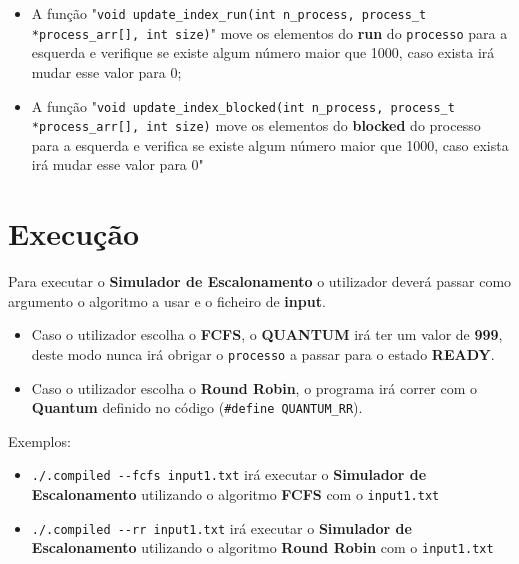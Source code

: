 \documentclass[11pt]{article}   %
\begin{document}
\begin{itemize}
\begin{itemize}
            \item A função "\verb|void update_index_run(int n_process, process_t *process_arr[], int size)|" \newline move os elementos do \textbf{run} do \verb|processo| para a esquerda e verifique se existe algum número maior que 1000, caso exista irá mudar esse valor para 0;
            \item A função "\verb|void update_index_blocked(int n_process, process_t *process_arr[], int size)| \newline move os elementos do \textbf{blocked} do processo para a esquerda e verifica se existe algum número maior que 1000, caso exista irá mudar esse valor para 0"
        \end{itemize}
\end{itemize}

\section{Execução}

\hspace{0,5cm}Para executar o \textbf{Simulador de Escalonamento} o utilizador deverá passar como argumento o algoritmo a usar e o ficheiro de \textbf{input}.
\begin{itemize}
    \item Caso o utilizador escolha o \textbf{FCFS}, o \textbf{QUANTUM} irá ter um valor de \textbf{999}, deste modo nunca irá obrigar o \verb|processo| a passar para o estado \textbf{READY}.
    \item Caso o utilizador escolha o \textbf{Round Robin}, o programa irá correr com o \textbf{Quantum} definido no código (\verb|#define QUANTUM_RR|).
\end{itemize}
\par Exemplos:
\begin{itemize}
    \item \verb|./.compiled --fcfs input1.txt| irá executar o \textbf{Simulador de Escalonamento} utilizando o algoritmo \textbf{FCFS} com o \verb|input1.txt|
    \item \verb|./.compiled --rr input1.txt| irá executar o \textbf{Simulador de Escalonamento} utilizando o algoritmo \textbf{Round Robin} com o \verb|input1.txt|
\end{itemize}
\newpage
\end{document}
